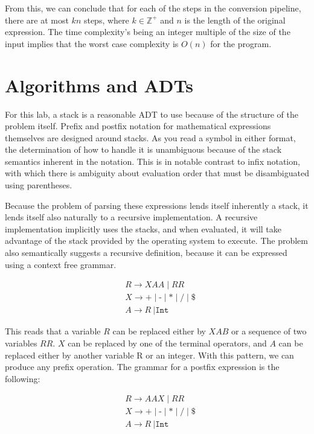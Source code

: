 \documentclass[10pt,letterpaper,final]{report}
\begin{document}
From this, we can conclude that for each of the steps in the conversion pipeline, there are at most $kn$ steps, where $k \in \mathbb{Z^+}$ and $n$ is the length of the original expression. The time complexity's being an integer multiple of the size of the input implies that the worst case complexity is $O(n)$ for the program.


\section{Algorithms and ADTs}

For this lab, a stack is a reasonable ADT to use because of the structure of the problem itself. Prefix and postfix notation for mathematical expressions themselves are designed around stacks. As you read a symbol in either format, the determination of how to handle it is unambiguous because of the stack semantics inherent in the notation. This is in notable contrast to infix notation, with which there is ambiguity about evaluation order that must be disambiguated using parentheses.

Because the problem of parsing these expressions lends itself inherently a stack, it lends itself also naturally to a recursive implementation. A recursive implementation implicitly uses the stacks, and when evaluated, it will take advantage of the stack provided by the operating system to execute. The problem also semantically suggests a recursive definition, because it can be expressed using a context free grammar.

\begin{align*}
   & R \to XAA \mid RR                                                                 \\
   & X \to \texttt{+} \mid \texttt{-} \mid \texttt{*} \mid \texttt{/} \mid \texttt{\$} \\
   & A \to R\ | \texttt{Int}
\end{align*}

This reads that a variable $R$ can be replaced either by $XAB$ or a sequence of two variables $RR$. $X$ can be replaced by one of the terminal operators, and $A$ can be replaced either by another variable R or an integer. With this pattern, we can produce any prefix operation. The grammar for a postfix expression is the following:

\begin{align*}
   & R \to AAX \mid RR                                                                 \\
   & X \to \texttt{+} \mid \texttt{-} \mid \texttt{*} \mid \texttt{/} \mid \texttt{\$} \\
   & A \to R\ | \texttt{Int}
\end{align*}
\end{document}
